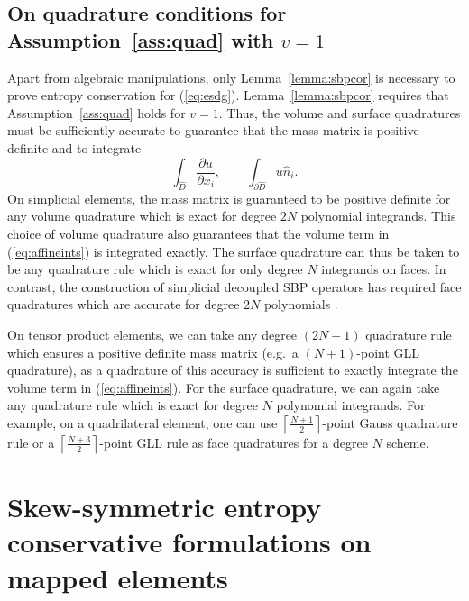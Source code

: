 \documentclass{svjour3}                     %
\renewcommand{\hat}{\widehat}
\newcommand{\pd}[2]{\frac{\partial#1}{\partial#2}}
\renewcommand{\note}[1]{{\color{blue}{#1}}}
\begin{document}
\subsection{On quadrature conditions for Assumption~\ref{ass:quad} with $v = 1$}
\label{sec:assump1}
Apart from algebraic manipulations, only Lemma~\ref{lemma:sbpcor} is necessary to prove entropy conservation for (\ref{eq:esdg}).  Lemma~\ref{lemma:sbpcor} requires that Assumption~\ref{ass:quad} holds for $v=1$.  Thus, the volume and surface quadratures must be sufficiently accurate to guarantee that the mass matrix is positive definite and to integrate 
\begin{equation}
\int_{\hat{D}} \pd{u}{x_i}, \qquad \int_{\partial \hat{D}} u \hat{n}_i. \label{eq:affineints}
\end{equation}
On simplicial elements, the mass matrix is guaranteed to be positive definite for any volume quadrature which is exact for degree $2N$ polynomial integrands.  This choice of volume quadrature also guarantees that the volume term in (\ref{eq:affineints}) is integrated exactly.  The surface quadrature can thus be taken to be any quadrature rule which is exact for only degree $N$ integrands on faces.  In contrast, the construction of simplicial decoupled SBP operators has required face quadratures which are accurate for degree $2N$ polynomials \cite{chan2017discretely, chan2018discretely}.  

On tensor product elements, we can take any degree $(2N-1)$ quadrature rule which ensures a positive definite mass matrix (e.g.\ a $(N+1)$-point GLL quadrature), as a quadrature of this accuracy is sufficient to exactly integrate the volume term in (\ref{eq:affineints}).  For the surface quadrature, we can again take any quadrature rule which is exact for degree $N$ polynomial integrands.  For example, on a quadrilateral element, one can use $\left\lceil\frac{N+1}{2}\right\rceil$-point Gauss quadrature rule or a $\left\lceil\frac{N+3}{2}\right\rceil$-point GLL rule as face quadratures for a degree $N$ scheme.  


\section{Skew-symmetric entropy conservative formulations on mapped elements}
\label{sec:skew2}
\end{document}
